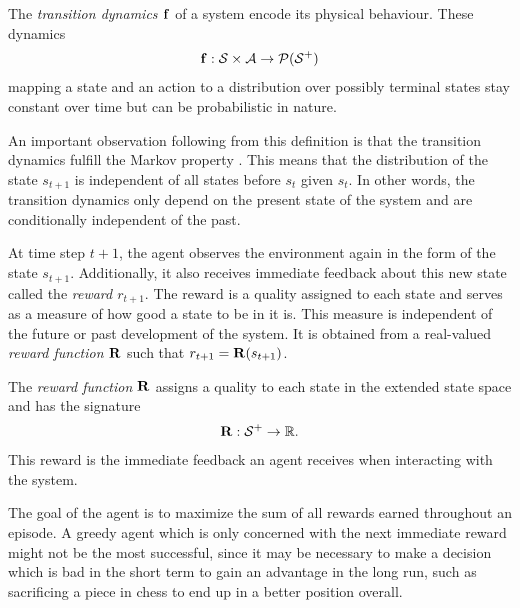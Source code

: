 \begin{definition}
    The \emph{transition dynamics $\operatorname{\mathbf{f}}$} of a system encode its physical behaviour.
    These dynamics
    \begin{align}
        \operatorname{\mathbf{f}} : \mathcal{S} \times \mathcal{A} \to \operatorname{\mathcal{P}}(\mathcal{S}^+)
    \end{align}
    mapping a state and an action to a distribution over possibly terminal states stay constant over time but can be probabilistic in nature.
\end{definition}
An important observation following from this definition is that the transition dynamics fulfill the Markov property \cite{sutton_reinforcement_1998}.
This means that the distribution of the state $s_{t+1}$ is independent of all states before $s_t$ given $s_t$.
In other words, the transition dynamics only depend on the present state of the system and are conditionally independent of the past.

At time step $t+1$, the agent observes the environment again in the form of the state $s_{t+1}$.
Additionally, it also receives immediate feedback about this new state called the \emph{reward $r_{t+1}$}.
The reward is a quality assigned to each state and serves as a measure of how good a state to be in it is.
This measure is independent of the future or past development of the system.
It is obtained from a real-valued \emph{reward function $\operatorname{\mathbf{R}}$} such that $r_{t+1} = \operatorname{\mathbf{R}}(s_{t+1})$.
\begin{definition}
    The \emph{reward function $\operatorname{\mathbf{R}}$} assigns a quality to each state in the extended state space and has the signature
    \begin{align}
        \operatorname{\mathbf{R}} : \mathcal{S}^+ \to \mathbb{R}.
    \end{align}
    This reward is the immediate feedback an agent receives when interacting with the system.
\end{definition}

The goal of the agent is to maximize the sum of all rewards earned throughout an episode.
A greedy agent which is only concerned with the next immediate reward might not be the most successful, since it may be necessary to make a decision which is bad in the short term to gain an advantage in the long run, such as sacrificing a piece in chess to end up in a better position overall.


